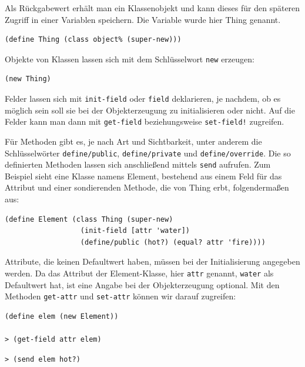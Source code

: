 Als Rückgabewert erhält man ein Klassenobjekt und kann dieses für den späteren Zugriff in einer Variablen speichern. Die Variable wurde hier Thing genannt.

\begin{lstlisting}
(define Thing (class object% (super-new)))
\end{lstlisting}

Objekte von Klassen lassen sich mit dem Schlüsselwort \texttt{new} erzeugen:

\begin{lstlisting}
(new Thing)
\end{lstlisting}

Felder lassen sich mit \texttt{init-field} oder \texttt{field} deklarieren, je nachdem, ob es möglich sein soll sie bei der Objekterzeugung zu initialisieren oder nicht. Auf die Felder kann man dann mit \texttt{get-field} beziehungsweise \texttt{set-field!} zugreifen. 

Für Methoden gibt es, je nach Art und Sichtbarkeit, unter anderem die Schlüsselwörter \texttt{define/public}, \texttt{define/private} und \texttt{define/override}. Die so definierten Methoden lassen sich anschließend mittels \texttt{send} aufrufen. Zum Beispiel sieht eine Klasse namens Element, bestehend aus einem Feld für das Attribut und einer sondierenden Methode, die von Thing erbt, folgendermaßen aus:

\begin{lstlisting}
(define Element (class Thing (super-new)
                  (init-field [attr 'water])
                  (define/public (hot?) (equal? attr 'fire))))
\end{lstlisting}

Attribute, die keinen Defaultwert haben, müssen bei der Initialisierung angegeben werden. Da das Attribut der Element-Klasse, hier \texttt{attr} genannt, \texttt{{\textquotesingle}water} als Defaultwert hat, ist eine Angabe bei der Objekterzeugung optional. Mit den Methoden \texttt{get-attr} und \texttt{set-attr} können wir darauf zugreifen:


\begin{lstlisting}
(define elem (new Element))

> (get-field attr elem)
\end{lstlisting} 
{}
\begin{lstlisting}
> (send elem hot?)
\end{lstlisting} 
{}

